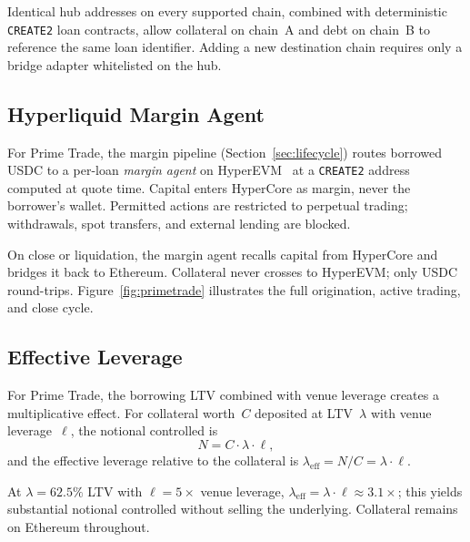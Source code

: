 Identical hub addresses on every supported chain, combined with deterministic \texttt{CREATE2} loan contracts, allow collateral on chain~A and debt on chain~B to reference the same loan identifier. Adding a new destination chain requires only a bridge adapter whitelisted on the hub.

\subsection{Hyperliquid Margin Agent}

For Prime Trade, the margin pipeline (Section~\ref{sec:lifecycle}) routes borrowed USDC to a per-loan \emph{margin agent} on HyperEVM~\cite{hyperliquid} at a \texttt{CREATE2} address computed at quote time. Capital enters HyperCore as margin, never the borrower's wallet. Permitted actions are restricted to perpetual trading; withdrawals, spot transfers, and external lending are blocked.

On close or liquidation, the margin agent recalls capital from HyperCore and bridges it back to Ethereum. Collateral never crosses to HyperEVM; only USDC round-trips. Figure~\ref{fig:primetrade} illustrates the full origination, active trading, and close cycle.

\subsection{Effective Leverage}

For Prime Trade, the borrowing LTV combined with venue leverage creates a multiplicative effect. For collateral worth~$C$ deposited at LTV~$\lambda$ with venue leverage~$\ell$, the notional controlled is
\begin{equation}
  N = C \cdot \lambda \cdot \ell,
  \label{eq:efflev}
\end{equation}
and the effective leverage relative to the collateral is $\lambda_{\mathrm{eff}} = N / C = \lambda \cdot \ell$.

At $\lambda = 62.5\%$ LTV with $\ell = 5\times$ venue leverage, $\lambda_{\mathrm{eff}} = \lambda \cdot \ell \approx 3.1\times$; this yields substantial notional controlled without selling the underlying. Collateral remains on Ethereum throughout.
